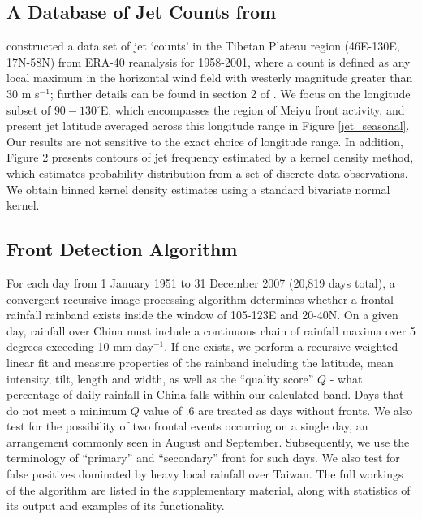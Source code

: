 \documentclass[draft,grl]{AGUTeX}
\begin{document}
\begin{article}
\subsection{A Database of Jet Counts from \citet{Schiemann2009}} 

	\citet{Schiemann2009} constructed a data set of jet `counts' in the Tibetan Plateau region (46\textdegree E-130\textdegree E, 17\textdegree N-58\textdegree N) from ERA-40 reanalysis for 1958-2001, where a count is defined as any local maximum in the horizontal wind field with westerly magnitude greater than $30$ m s$^{-1}$; further details can be found in section 2 of \citet{Schiemann2009}. We focus on the longitude subset of $90-130^\circ$E, which encompasses the region of Meiyu front activity, and present jet latitude averaged across this longitude range in Figure \ref{jet_seasonal}. Our results are not sensitive to the exact choice of longitude range. In addition, Figure 2 presents contours of jet frequency estimated by a kernel density method, which estimates probability distribution from a set of discrete data observations. We obtain binned kernel density estimates using a standard bivariate normal kernel. 
	
\subsection{Front Detection Algorithm}

	For each day from 1 January 1951 to 31 December 2007 (20,819 days total), a convergent recursive image processing algorithm determines whether a frontal rainfall rainband exists inside the window of 105-123E and 20-40N. On a given day, rainfall over China must include a continuous chain of rainfall maxima over 5 degrees exceeding 10 mm day$^{-1}$. If one exists, we perform a recursive weighted linear fit and measure properties of the rainband including the latitude, mean intensity, tilt, length and width, as well as the ``quality score'' $Q$ - what percentage of daily rainfall in China falls within our calculated band. Days that do not meet a minimum $Q$ value of .6 are treated as days without fronts. We also test for the possibility of two frontal events occurring on a single day, an arrangement commonly seen in August and September. Subsequently, we use the terminology of ``primary'' and ``secondary'' front for such days. We also test for false positives dominated by heavy local rainfall over Taiwan. The full workings of the algorithm are listed in the supplementary material, along with statistics of its output and examples of its functionality.
	

\end{article}
\end{document}
